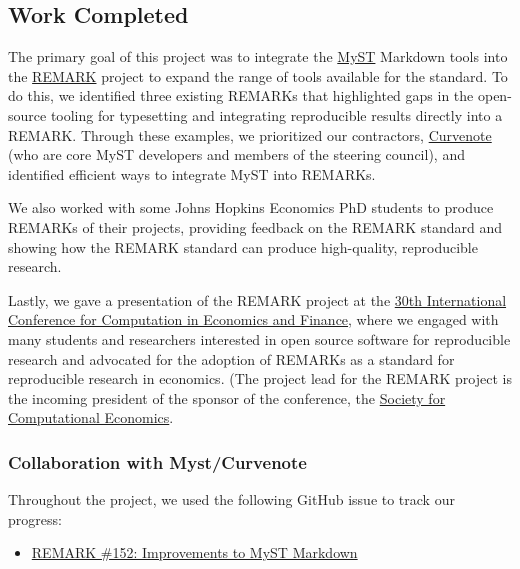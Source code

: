 \documentclass{article}
\begin{document}
\subsection{Work Completed}


The primary goal of this project was to integrate the \href{https://github.com/jupyter-book/mystmd}{MyST} Markdown tools into the \href{https://github.com/econ-ark/REMARK}{REMARK} project to expand the range of tools available for the standard. To do this, we identified three existing REMARKs that highlighted gaps in the open-source tooling for typesetting and integrating reproducible results directly into a REMARK. Through these examples, we prioritized our contractors, \href{https://curvenote.com}{Curvenote} (who are core MyST developers and members of the steering council), and identified efficient ways to integrate MyST into REMARKs.

We also worked with some Johns Hopkins Economics PhD students to produce REMARKs of their projects, providing feedback on the REMARK standard and showing how the REMARK standard can produce high-quality, reproducible research.

Lastly, we gave a presentation of the REMARK project at the \href{https://comp-econ.com/30th-conference/}{30th International Conference for Computation in Economics and Finance}, where we engaged with many students and researchers interested in open source software for reproducible research and advocated for the adoption of REMARKs as a standard for reproducible research in economics. (The project lead for the REMARK project is the incoming president of the sponsor of the conference, the \href{https://comp-econ.com/}{Society for Computational Economics}.

\subsubsection{Collaboration with Myst/Curvenote}

Throughout the project, we used the following GitHub issue to track our progress:

\begin{itemize}
\item \href{https://github.com/econ-ark/REMARK/issues/152}{REMARK \#152: Improvements to MyST Markdown}
\end{itemize}
\end{document}
